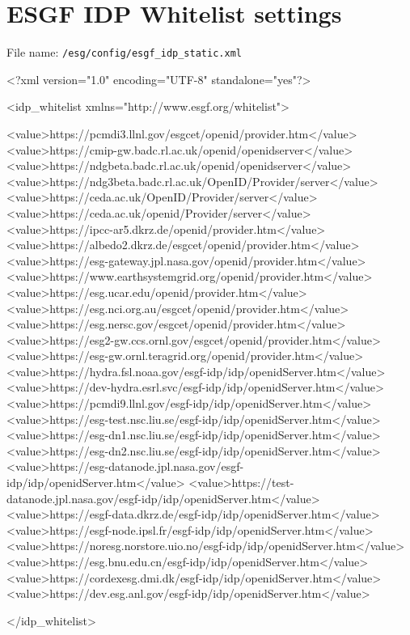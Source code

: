 \section{ESGF IDP Whitelist settings}
File name: \texttt{/esg/config/esgf\_idp\_static.xml}
\begin{tiny}
\begin{verbatimtab}[4]
<?xml version="1.0" encoding="UTF-8" standalone="yes"?>

<idp_whitelist xmlns="http://www.esgf.org/whitelist">

	<value>https://pcmdi3.llnl.gov/esgcet/openid/provider.htm</value>
	<value>https://cmip-gw.badc.rl.ac.uk/openid/openidserver</value>
	<value>https://ndgbeta.badc.rl.ac.uk/openid/openidserver</value>
	<value>https://ndg3beta.badc.rl.ac.uk/OpenID/Provider/server</value>
	<value>https://ceda.ac.uk/OpenID/Provider/server</value>
	<value>https://ceda.ac.uk/openid/Provider/server</value>
	<value>https://ipcc-ar5.dkrz.de/openid/provider.htm</value>
	<value>https://albedo2.dkrz.de/esgcet/openid/provider.htm</value>
	<value>https://esg-gateway.jpl.nasa.gov/openid/provider.htm</value>
	<value>https://www.earthsystemgrid.org/openid/provider.htm</value>
	<value>https://esg.ucar.edu/openid/provider.htm</value>
	<value>https://esg.nci.org.au/esgcet/openid/provider.htm</value>
	<value>https://esg.nersc.gov/esgcet/openid/provider.htm</value>
	<value>https://esg2-gw.ccs.ornl.gov/esgcet/openid/provider.htm</value>
	<value>https://esg-gw.ornl.teragrid.org/openid/provider.htm</value>
	<value>https://hydra.fsl.noaa.gov/esgf-idp/idp/openidServer.htm</value>
	<value>https://dev-hydra.esrl.svc/esgf-idp/idp/openidServer.htm</value>
	<value>https://pcmdi9.llnl.gov/esgf-idp/idp/openidServer.htm</value>
	<value>https://esg-test.nsc.liu.se/esgf-idp/idp/openidServer.htm</value>
	<value>https://esg-dn1.nsc.liu.se/esgf-idp/idp/openidServer.htm</value>
	<value>https://esg-dn2.nsc.liu.se/esgf-idp/idp/openidServer.htm</value>
	<value>https://esg-datanode.jpl.nasa.gov/esgf-idp/idp/openidServer.htm</value>
	<value>https://test-datanode.jpl.nasa.gov/esgf-idp/idp/openidServer.htm</value>
	<value>https://esgf-data.dkrz.de/esgf-idp/idp/openidServer.htm</value>
	<value>https://esgf-node.ipsl.fr/esgf-idp/idp/openidServer.htm</value>
	<value>https://noresg.norstore.uio.no/esgf-idp/idp/openidServer.htm</value>
	<value>https://esg.bnu.edu.cn/esgf-idp/idp/openidServer.htm</value>
	<value>https://cordexesg.dmi.dk/esgf-idp/idp/openidServer.htm</value>
	<value>https://dev.esg.anl.gov/esgf-idp/idp/openidServer.htm</value>

</idp_whitelist>
\end{verbatimtab}
\end{tiny}
